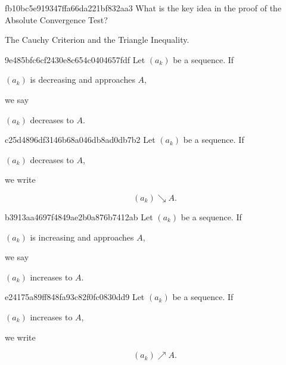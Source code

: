 \begin{note}{fb10bc5e919347ffa66da221bf832aa3}
    What is the key idea in the proof of the Absolute Convergence Test?

    \begin{cloze}{1}
        The Cauchy Criterion and the Triangle Inequality.
    \end{cloze}
\end{note}

\begin{note}{9e485bfc6cf2430e8c654c0404657fdf}
    Let \({ (a_k) }\) be a sequence.
    If \begin{icloze}{2}\({ (a_k) }\) is decreasing and approaches \({ A }\),\end{icloze} we say \begin{icloze}{1}\({ (a_k) }\) decreases to \({ A }\).\end{icloze}
\end{note}

\begin{note}{c25d4896df3146b68a046db8ad0db7b2}
    Let \({ (a_k) }\) be a sequence.
    If \begin{icloze}{2}\({ (a_k) }\) decreases to \({ A }\),\end{icloze} we write
    \begin{icloze}{1}
        \[
            (a_k) \searrow A.
        \]
    \end{icloze}
\end{note}

\begin{note}{b3913aa4697f4849ae2b0a876b7412ab}
    Let \({ (a_k) }\) be a sequence.
    If \begin{icloze}{2}\({ (a_k) }\) is increasing and approaches \({ A }\),\end{icloze} we say \begin{icloze}{1}\({ (a_k) }\) increases to \({ A }\).\end{icloze}
\end{note}

\begin{note}{e24175a89ff848fa93c82f0fc0830dd9}
    Let \({ (a_k) }\) be a sequence.
    If \begin{icloze}{2}\({ (a_k) }\) increases to \({ A }\),\end{icloze} we write
    \begin{icloze}{1}
        \[
            (a_k) \nearrow A.
        \]
    \end{icloze}
\end{note}

